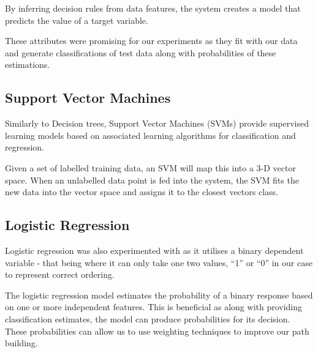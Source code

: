 \documentclass[bsc,frontabs,twoside,singlespacing,parskip,deptreport]{infthesis}     %
\begin{document}
By inferring decision rules from data features, the system creates a model that predicts the value of a target variable.

These attributes were promising for our experiments as they fit with our data and generate
classifications of test data along with probabilities of these estimations.


\subsection{Support Vector Machines}
Similarly to Decision trees, Support Vector Machines (SVMs) provide supervised learning models based on
associated learning algorithms for classification and regression.

Given a set of labelled training data, an SVM will map this into a 3-D vector space.
When an unlabelled data point is fed into the system, the SVM fits the new data into the vector space and
assigns  it to the closest vectors class.

\subsection{Logistic Regression}
Logistic regression was also experimented with as it utilises a binary dependent variable - that being where it
can only take one two values, ``1'' or ``0'' in our case to represent correct ordering.


The logistic regression model estimates the probability of a binary response based on one or more independent features.
This is beneficial as along with providing classification estimates, the model can produce probabilities for its
decision. These probabilities can allow us to use weighting techniques to improve our path building.
\end{document}
